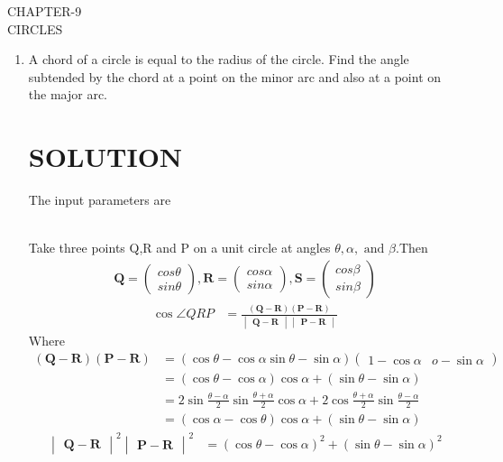 \documentclass[12pt]{article}
\newcommand{\mydet}[1]{\ensuremath{\begin{vmatrix}#1\end{vmatrix}}}
\providecommand{\brak}[1]{\ensuremath{\left(#1\right)}}
\newcommand{\myvec}[1]{\ensuremath{\begin{pmatrix}#1\end{pmatrix}}}
\let\vec\mathbf
\begin{document}
\begin{center}
\textbf\large{CHAPTER-9 \\ CIRCLES}

\end{center}
\begin{enumerate}
\section{EXERCISE-10.5}
\item A chord of a circle is equal to the radius of the circle. Find the angle subtended by the chord at a point on the minor arc and also at a point on the major arc.
\section{SOLUTION}
The input parameters are\\
\begin{table}[h!]
	
\caption{}
\label{table}	
\end{table}
\\
Take three points Q,R and P on a unit circle  at angles $\theta,\alpha,\text{ and }\beta$.Then
\begin{align}
	\vec{Q} = \myvec{cos\theta\\sin\theta},
	\vec{R} = \myvec{cos\alpha\\sin\alpha},
	\vec{S} = \myvec{cos\beta\\sin\beta}
\end{align}
\begin{align}
	\cos\angle QRP&= \frac{\brak{\vec{Q}-\vec{R}}\brak{\vec{P}-\vec{R}}}{\mydet{\vec{Q}-\vec{R}}\mydet{\vec{P}-\vec{R}}}\label{2}
\end{align}
Where
\begin{align}
\brak{\vec{Q}-\vec{R}}\brak{\vec{P}-\vec{R}}&= \brak{\cos\theta-\cos\alpha \sin\theta-\sin\alpha}\myvec{1-\cos\alpha &o-\sin\alpha}\\
&=\brak{\cos\theta-\cos\alpha}\cos\alpha+\brak{\sin\theta-\sin\alpha}\\
&=2\sin\frac{\theta-\alpha}{2}\sin\frac{\theta+\alpha}{2}\cos\alpha+2\cos\frac{\theta+\alpha}{2}\sin\frac{\theta-\alpha}{2}\\
&=\brak{\cos\alpha-\cos\theta}\cos\alpha+\brak{\sin\theta-\sin\alpha}\label{6}
\end{align}
\begin{align}
\mydet{\vec{Q}-\vec{R}}^2\mydet{\vec{P}-\vec{R}}^2 &= \brak{\cos\theta-\cos\alpha}^2+\brak{\sin\theta-\sin\alpha}^2

\end{align}
\end{enumerate}
\end{document}
